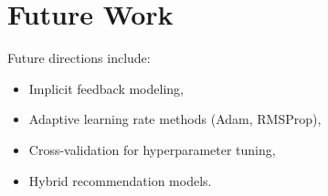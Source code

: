 \documentclass[10pt,twocolumn]{article}
\begin{document}
\section{Future Work}
Future directions include:
\begin{itemize}
    \item Implicit feedback modeling,
    \item Adaptive learning rate methods (Adam, RMSProp),
    \item Cross-validation for hyperparameter tuning,
    \item Hybrid recommendation models.
\end{itemize}
\end{document}

